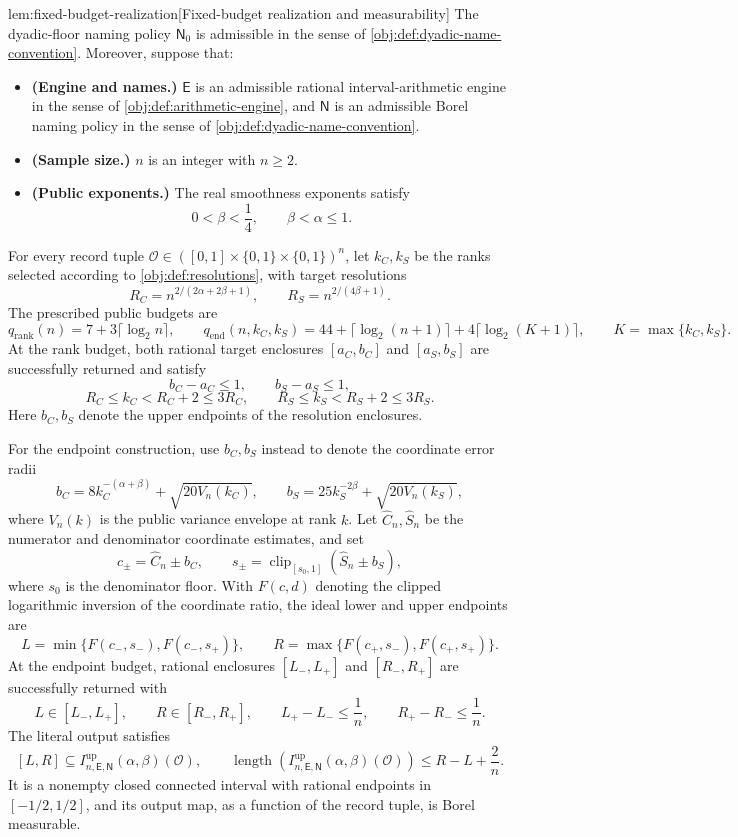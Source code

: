 \begin{lemmav}{lem:fixed-budget-realization}[Fixed-budget realization and measurability]
The dyadic-floor naming policy \(\mathsf N_0\) is admissible in the sense of \cref{obj:def:dyadic-name-convention}. Moreover, suppose that:
\begin{itemize}
\item \textbf{(Engine and names.)} \(\mathsf E\) is an admissible rational interval-arithmetic engine in the sense of \cref{obj:def:arithmetic-engine}, and \(\mathsf N\) is an admissible Borel naming policy in the sense of \cref{obj:def:dyadic-name-convention}.
\item \textbf{(Sample size.)} \(n\) is an integer with \(n\ge2\).
\item \textbf{(Public exponents.)} The real smoothness exponents satisfy
\[
0<\beta<\frac14,\qquad \beta<\alpha\le1.
\]
\end{itemize}
For every record tuple \(\mathcal O\in([0,1]\times\{0,1\}\times\{0,1\})^n\), let \(k_C,k_S\) be the ranks selected according to \cref{obj:def:resolutions}, with target resolutions
\[
R_C=n^{2/(2\alpha+2\beta+1)},\qquad
R_S=n^{2/(4\beta+1)}.
\]
The prescribed public budgets are
\[
q_{\mathrm{rank}}(n)=7+3\lceil\log_2 n\rceil,\qquad
q_{\mathrm{end}}(n,k_C,k_S)
=44+\lceil\log_2(n+1)\rceil
 +4\lceil\log_2(K+1)\rceil,\qquad
K=\max\{k_C,k_S\}.
\]
At the rank budget, both rational target enclosures \([a_C,b_C]\) and \([a_S,b_S]\) are successfully returned and satisfy
\[
b_C-a_C\le1,\qquad b_S-a_S\le1,
\]
\[
R_C\le k_C<R_C+2\le3R_C,\qquad
R_S\le k_S<R_S+2\le3R_S.
\]
Here \(b_C,b_S\) denote the upper endpoints of the resolution enclosures.

For the endpoint construction, use \(b_C,b_S\) instead to denote the coordinate error radii
\[
b_C=8k_C^{-(\alpha+\beta)}+\sqrt{20V_n(k_C)},\qquad
b_S=25k_S^{-2\beta}+\sqrt{20V_n(k_S)},
\]
where \(V_n(k)\) is the public variance envelope at rank \(k\). Let \(\widehat C_n,\widehat S_n\) be the numerator and denominator coordinate estimates, and set
\[
c_\pm=\widehat C_n\pm b_C,\qquad
s_\pm=\operatorname{clip}_{[s_0,1]}(\widehat S_n\pm b_S),
\]
where \(s_0\) is the denominator floor. With \(F(c,d)\) denoting the clipped logarithmic inversion of the coordinate ratio, the ideal lower and upper endpoints are
\[
L=\min\{F(c_-,s_-),F(c_-,s_+)\},\qquad
R=\max\{F(c_+,s_-),F(c_+,s_+)\}.
\]
At the endpoint budget, rational enclosures \([L_-,L_+]\) and \([R_-,R_+]\) are successfully returned with
\[
L\in[L_-,L_+],\qquad R\in[R_-,R_+],\qquad
L_+-L_-\le\frac1n,\qquad R_+-R_-\le\frac1n.
\]
The literal output satisfies
\[
[L,R]\subseteq
I^{\mathrm{up}}_{n,\mathsf E,\mathsf N}(\alpha,\beta)(\mathcal O),
\qquad
\operatorname{length}\!\left(
I^{\mathrm{up}}_{n,\mathsf E,\mathsf N}(\alpha,\beta)(\mathcal O)
\right)
\le R-L+\frac2n.
\]
It is a nonempty closed connected interval with rational endpoints in \([-1/2,1/2]\), and its output map, as a function of the record tuple, is Borel measurable.
\end{lemmav}

